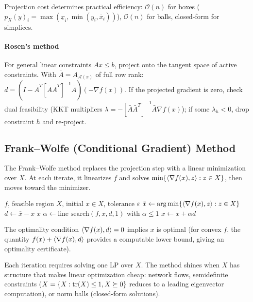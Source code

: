 Projection cost determines practical efficiency: $\mathcal{O}(n)$ for boxes ($p_X(y)_i = \max(\underline{x}_i, \min(y_i, \overline{x}_i))$), $\mathcal{O}(n)$ for balls, closed-form for simplices.

\paragraph{Rosen's method}

For general linear constraints $Ax \leq b$, project onto the tangent space of active constraints.
With $\bar{A} = A_{\mathcal{A}(x)}$ of full row rank:
$d = (I - \bar{A}^T[\bar{A}\bar{A}^T]^{-1}\bar{A})(-\nabla f(x))$.
If the projected gradient is zero, check dual feasibility (KKT multipliers $\lambda = -[\bar{A}\bar{A}^T]^{-1}\bar{A}\nabla f(x)$); if some $\lambda_h < 0$, drop constraint $h$ and re-project.


\subsection{Frank--Wolfe (Conditional Gradient) Method}\label{ssec:frank-wolfe}

The Frank--Wolfe method replaces the projection step with a linear minimization over $X$.
At each iterate, it linearizes $f$ and solves $\min\{\langle\nabla f(x), z\rangle : z \in X\}$, then moves toward the minimizer.

\begin{algorithm}
	\caption{Frank--Wolfe Method (FW)}
	\label{alg:FW}
	\begin{algorithmic}[1]
		\Require $f$, feasible region $X$, initial $x \in X$, tolerance $\varepsilon$
				\State $\bar{x} \gets \operatorname*{arg\,min}\{\langle\nabla f(x), z\rangle : z \in X\}$ 
				\State $d \gets \bar{x} - x$
				 \Return $x$ \EndIf
				\State $\alpha \gets \text{line search}(f, x, d, 1)$ with $\alpha \leq 1$
				\State $x \gets x + \alpha d$
			\EndWhile
		\EndProcedure
	\end{algorithmic}
\end{algorithm}

The optimality condition $\langle\nabla f(x), d\rangle = 0$ implies $x$ is optimal (for convex $f$, the quantity $f(x) + \langle\nabla f(x), d\rangle$ provides a computable lower bound, giving an optimality certificate).

Each iteration requires solving one LP over $X$.
The method shines when $X$ has structure that makes linear optimization cheap: network flows, semidefinite constraints ($X = \{X : \operatorname{tr}(X) \leq 1, X \succeq 0\}$ reduces to a leading eigenvector computation), or norm balls (closed-form solutions).

